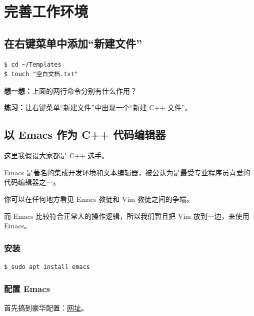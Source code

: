 \documentclass[UTF-8]{ctexart}
\begin{document}
	\section{完善工作环境}
	
		\subsection{在右键菜单中添加“新建文件”}
		
			\begin{verbatim}
$ cd ~/Templates
$ touch "空白文档.txt"
			\end{verbatim}
		
			\textbf{想一想：}上面的两行命令分别有什么作用？
			
			\textbf{练习：}让右键菜单“新建文件”中出现一个“新建 C++ 文件”。
	
		\subsection{以 Emacs 作为 C++ 代码编辑器}
		
			这里我假设大家都是 C++ 选手。
			
			Emacs 是著名的集成开发环境和文本编辑器，被公认为是最受专业程序员喜爱的代码编辑器之一。
			
			你可以在任何地方看见 Emacs 教徒和 Vim 教徒之间的争端。
			
			而 Emacs 比较符合正常人的操作逻辑，所以我们暂且把 Vim 放到一边，来使用 Emacs。
		
			\subsubsection{安装}
		
				\begin{verbatim}
$ sudo apt install emacs
				\end{verbatim}
			
			\subsubsection{配置 Emacs}
			
				首先搞到豪华配置：\href{https://www.luogu.com.cn/paste/uzsz2zf4}{网址}。
				
\end{document}
